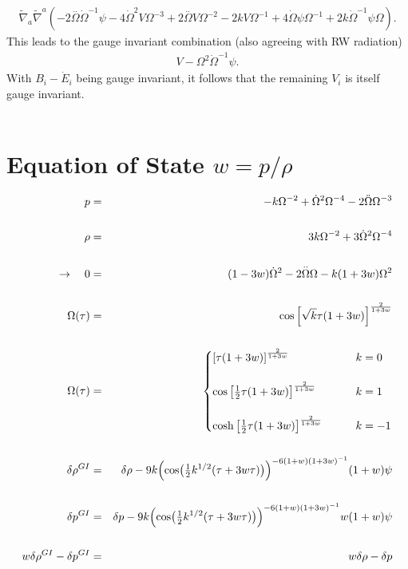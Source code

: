 \documentclass[10pt,letterpaper]{article}
\numberwithin{equation}{section}
\begin{document}
\begin{eqnarray}
\tilde\nabla_a\tilde\nabla^a \left( -2 \overset{..}{\Omega} \dot{\Omega}^{-1} \psi - 4 \dot{\Omega}^2 V \Omega^{-3} + 2 \overset{..}{\Omega} V \Omega^{-2} - 2 k V \Omega^{-1} + 4 \dot{\Omega} \psi \Omega^{-1} + 2 k \dot{\Omega}^{-1} \psi \Omega \right).
\end{eqnarray}
This leads to the gauge invariant combination (also agreeing with RW radiation)
\begin{eqnarray}
 &\boxed{ V-\Omega^2 \dot\Omega^{-1}\psi}.&
\end{eqnarray}
With $B_i-\dot E_i$ being gauge invariant, it follows that the remaining $V_i$ is itself gauge invariant. 
%
%
\\ \\
\section{Equation of State $w = p/\rho$}
\begin{eqnarray}
p &=&  -k\Omega^{-2} + \dot\Omega^2\Omega^{-4} -2\ddot\Omega \Omega^{-3}
\\ \nonumber\\
\rho &=& 3k\Omega^{-2}+3\dot\Omega^2 \Omega^{-4}
\\ \nonumber\\
\to\quad 0&=& (1-3w)\dot{\Omega}^2 - 2 \overset{..}{\Omega} \Omega -  k(1+3w) \Omega^{2} 
\\ \nonumber\\
\Omega(\tau) &=& \cos\left[\sqrt k \tau(1+3w)\right]^{\frac{2}{1+3w}}
\\ \nonumber\\
\Omega(\tau) &=& 
\begin{cases}
	\left[\tau(1+3w)\right]^{\frac{2}{1+3w}} &\qquad k=0
	\\ \\
	\cos\left[ \frac12 \tau(1+3w)\right]^{\frac{2}{1+3w}} &\qquad k=1
	\\ \\
	\cosh\left[ \frac12 \tau(1+3w)\right]^{\frac{2}{1+3w}} &\qquad k=-1
\end{cases}
\\ \nonumber\\
\delta \rho^{GI} &=& \delta \rho - 9 k \Bigl(\cos\bigl(\tfrac{1}{2} k^{1/2} (\tau + 3 w \tau)\bigr)\Bigr)^{-6 (1 + w) (1 + 3 w)^{-1}} (1 + w) \psi 
\\ \nonumber\\
\delta p^{GI} &=& \delta p - 9 k \Bigl(\cos\bigl(\tfrac{1}{2} k^{1/2} (\tau + 3 w \tau)\bigr)\Bigr)^{-6 (1 + w) (1 + 3 w)^{-1}} w (1 + w) \psi
\\ \nonumber\\
w \delta \rho^{GI} -\delta p^{GI} &=& w\delta \rho - \delta p
\end{eqnarray}
\end{document}
